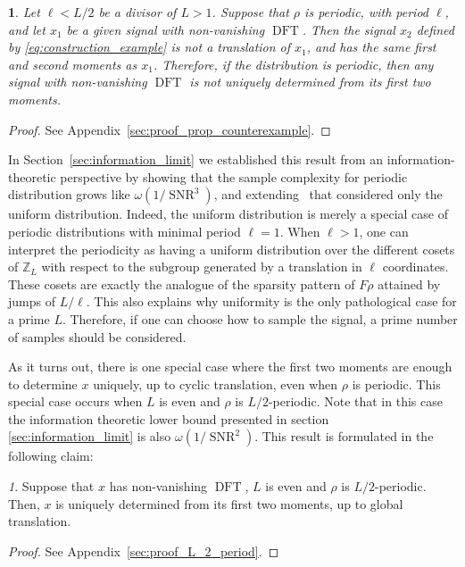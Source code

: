 \documentclass{IEEEtran}
\numberwithin{equation}{section}
\numberwithin{figure}{section}
\theoremstyle{plain}
\theoremstyle{definition}
\theoremstyle{remark}
\newtheorem{claim}[thm]{\protect\claimname}
\theoremstyle{plain}
\theoremstyle{remark}
\theoremstyle{plain}
\theoremstyle{plain}
\newtheorem{proposition}[thm]{\protect\propositionname}
\theoremstyle{remark}
\providecommand{\claimname}{Claim}
\providecommand{\propositionname}{Proposition}
\newcommand{\F}{F}
\newcommand{\DFT}{\operatorname{DFT}}
\newcommand{\SNR}{\operatorname{SNR}}
\begin{document}
\begin{proposition} \label{prop:counterexample}
    Let $\ell<L/2$ be a divisor of $L>1$. Suppose that $\rho$ is periodic, with period $\ell$, and let $x_1$ be a given signal with non-vanishing $\DFT$. Then the signal $x_2$ defined by \eqref{eq:construction_example} is not a translation of $x_1$, and has the same first and second moments as $x_1$. Therefore, if the distribution is periodic, then any signal with non-vanishing $\DFT$ is not uniquely determined from its first two moments.
\end{proposition}
    \begin{proof}
        See Appendix~\ref{sec:proof_prop_counterexample}.
    \end{proof}
In Section~\ref{sec:information_limit} we established this result from an information-theoretic perspective by showing that the sample complexity for periodic distribution grows like $\omega(1/\SNR^3)$, and extending~\cite{bandeira2017optimal} that considered only the uniform distribution. Indeed, 
the uniform distribution is merely a special case of periodic distributions with minimal period $\ell = 1$. When $\ell>1$, one can interpret the periodicity as having a uniform distribution over the different cosets of $\mathbb{Z}_L$ with respect to the subgroup generated by a translation in $\ell$ coordinates. These cosets are exactly the analogue of the sparsity pattern of ${\F{\rho}}$ attained by jumps of $L/\ell$. This also explains why uniformity is the only pathological case for a prime $L$. Therefore, if one can choose how to sample the signal, a prime number of samples should be considered. 

As it turns out, there is one special case where the first two moments are enough to determine $x$ uniquely, up to cyclic translation, even when $\rho$ is periodic. This special case occurs when $L$ is even and $\rho$ is $L/2$-periodic. Note that in this case the information theoretic lower bound presented in section \ref{sec:information_limit} is also $\omega(1/\SNR^2)$. This result is formulated in the following claim:
\begin{claim} \label{claim:L_2_period}
    Suppose that $x$ has non-vanishing $\DFT$, $L$ is even and $\rho$ is $L/2$-periodic. Then, $x$ is uniquely determined from its first two moments, up to global translation.
    \begin{proof}
        See Appendix~\ref{sec:proof_L_2_period}.
    \end{proof} 
\end{claim}
\end{document}
